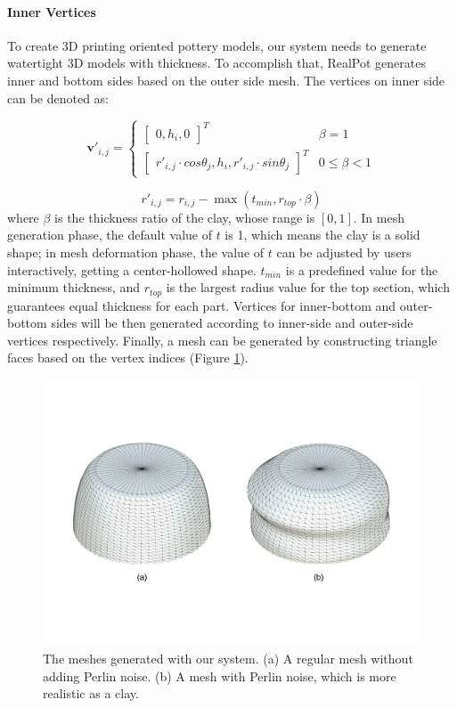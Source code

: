 \documentclass{svjour3}                     %
\begin{document}
\paragraph{Inner Vertices} To create 3D printing oriented pottery models, our system needs to generate watertight 3D models with thickness.
To accomplish that, RealPot generates inner and bottom sides based on the outer side mesh. The vertices on inner side can be denoted as:

\begin{equation}
\label{eqn:v'}
\mathbf{v'}_{i,j} 
= \begin{cases}
\begin{bmatrix}
0,h_{i},0
\end{bmatrix}^T & \beta=1
\\
\begin{bmatrix}
r'_{i,j} \cdot cos \theta_{j},
h_{i},
r'_{i,j} \cdot sin \theta_{j}
\end{bmatrix}^T & 0 \le \beta<1
\end{cases}
\end{equation}

\begin{equation}
r'_{i,j} = r_{i,j} - \max(t_{min}, r_{top} \cdot \beta)
\end{equation}
where $\beta$ is the thickness ratio of the clay, whose range is $[0,1]$. In mesh generation phase, the default value of $t$ is 1, which means the clay is a solid shape; in mesh deformation phase, the value of $t$ can be adjusted by users interactively, getting a center-hollowed shape. $t_{min}$ is a predefined value for the minimum thickness, and $r_{top}$ is the largest radius value for the top section, which guarantees equal thickness for each part.
Vertices for inner-bottom and outer-bottom sides will be then generated according to inner-side and outer-side vertices respectively. Finally, a mesh can be generated by constructing triangle faces based on the vertex indices (Figure \ref{fig:mesh}).

\begin{figure}
\includegraphics[width=\textwidth]{fig6}
\caption{The meshes generated with our system. (a) A regular mesh without adding Perlin noise. (b) A mesh with Perlin noise, which is more realistic as a clay.}
\label{fig:mesh}
\end{figure}
\end{document}
